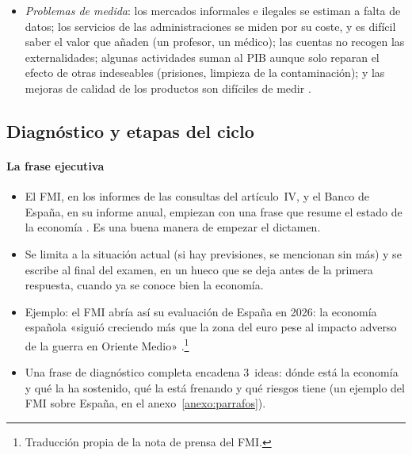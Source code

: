 \documentclass[11pt]{article}
\begin{document}
\begin{itemize}
\[
\mathrm{RNB}=\mathrm{PIB}+\mathrm{RP},\qquad\mathrm{RNDB}=\mathrm{RNB}+\mathrm{RS} .
\]
  Cómo se leen sus diferencias está en el apartado~\ref{sec:medidores}.
\item \emph{Problemas de medida}: los mercados informales e ilegales se estiman a falta de datos; los servicios de las administraciones se miden por su coste, y es difícil saber el valor que añaden (un profesor, un médico); las cuentas no recogen las externalidades; algunas actividades suman al PIB aunque solo reparan el efecto de otras indeseables (prisiones, limpieza de la contaminación); y las mejoras de calidad de los productos son difíciles de medir .
\end{itemize}

\subsection{Diagnóstico y etapas del ciclo}\label{sec:etapas}

\paragraph{La frase ejecutiva}
\begin{itemize}
\item El FMI, en los informes de las consultas del artículo~IV, y el Banco de España, en su informe anual, empiezan con una frase que resume el estado de la economía \parencite{FMI2026ArticuloIV,BdE2026InformeAnual}. Es una buena manera de empezar el dictamen.
\item Se limita a la situación actual (si hay previsiones, se mencionan sin más) y se escribe al final del examen, en un hueco que se deja antes de la primera respuesta, cuando ya se conoce bien la economía.
\item Ejemplo: el FMI abría así su evaluación de España en 2026: la economía española «siguió creciendo más que la zona del euro pese al impacto adverso de la guerra en Oriente Medio» \parencite{FMI2026ArticuloIV}.\footnote{Traducción propia de la nota de prensa del FMI.}
\item Una frase de diagnóstico completa encadena 3~ideas: dónde está la economía y qué la ha sostenido, qué la está frenando y qué riesgos tiene (un ejemplo del FMI sobre España, en el anexo~\ref{anexo:parrafos}).
\end{itemize}
\end{document}
